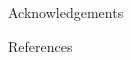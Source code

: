 \documentclass[final]{beamer}
\newlength{\sepwidth}
\newlength{\colwidth}
\newcommand{\separatorcolumn}{\begin{column}{\sepwidth}\end{column}}
\begin{document}
\begin{frame}[t]
\begin{columns}[t]
\begin{column}{\colwidth}
\begin{block}{Acknowledgements}
                \end{block}


                \begin{block}{References}
                    \footnotesize{}

                \end{block}

            \end{column}
            \separatorcolumn
        \end{columns}

    \end{frame}
\end{document}
